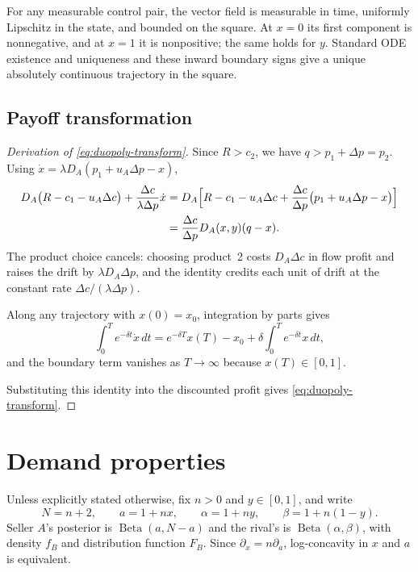 \documentclass[11pt]{article}
\DeclareMathOperator{\Beta}{Beta}
\theoremstyle{definition}
\begin{document}
For any measurable control pair, the vector field is measurable in time,
uniformly Lipschitz in the state, and bounded on the square. At $x=0$ its
first component is nonnegative, and at $x=1$ it is nonpositive; the same
holds for $y$. Standard ODE existence and uniqueness and these inward
boundary signs give a unique absolutely continuous trajectory in the square.

\subsection{Payoff transformation}\label{app:transform}

\begin{proof}[Derivation of \eqref{eq:duopoly-transform}]
Since $R>c_2$, we have $q>p_1+\Delta p=p_2$. Using
$\dot x=\lambda D_A(p_1+u_A\Delta p-x)$,
\begin{align*}
D_A\bigl(R-c_1-u_A\Delta c\bigr)+\frac{\Delta c}{\lambda\Delta p}\dot x
&=D_A\Bigl[R-c_1-u_A\Delta c
+\frac{\Delta c}{\Delta p}\bigl(p_1+u_A\Delta p-x\bigr)\Bigr]\\
&=\frac{\Delta c}{\Delta p}D_A(x,y)(q-x).
\end{align*}
The product choice cancels: choosing product~2 costs $D_A\Delta c$ in flow
profit and raises the drift by $\lambda D_A\Delta p$, and the identity
credits each unit of drift at the constant rate $\Delta c/(\lambda\Delta p)$.

Along any trajectory with $x(0)=x_0$, integration by parts gives
\begin{equation*}
\int_0^T e^{-\delta t}\dot x\,dt
=e^{-\delta T}x(T)-x_0+\delta\int_0^T e^{-\delta t}x\,dt,
\end{equation*}
and the boundary term vanishes as $T\to\infty$ because $x(T)\in[0,1]$.

Substituting this identity into the discounted profit gives
\eqref{eq:duopoly-transform}.
\end{proof}

\section{Demand properties}\label{app:demand}

Unless explicitly stated otherwise, fix $n>0$ and $y\in[0,1]$, and write
\begin{equation*}
N=n+2,\qquad a=1+nx,\qquad \alpha=1+ny,\qquad \beta=1+n(1-y).
\end{equation*}
Seller $A$'s posterior is $\Beta(a,N-a)$ and the rival's is
$\Beta(\alpha,\beta)$, with density $f_B$ and distribution function $F_B$.
Since $\partial_x=n\partial_a$, log-concavity in $x$ and $a$ is equivalent.
\end{document}
